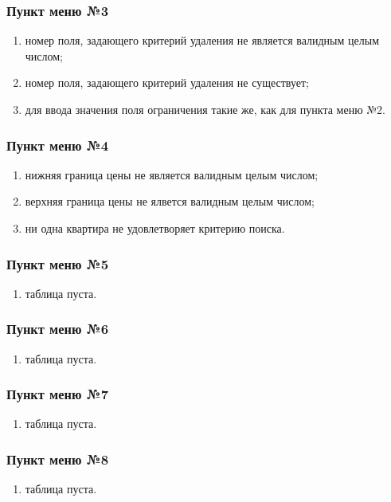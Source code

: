 \documentclass[a4paper,12pt]{extarticle}
\begin{document}
\subsubsection{Пункт меню №3}
\begin{enumerate}
    \item номер поля, задающего критерий удаления не является валидным целым числом;
    \item номер поля, задающего критерий удаления не существует;
    \item для ввода значения поля ограничения такие же, как для пункта меню №2.
\end{enumerate}

\subsubsection{Пункт меню №4}
\begin{enumerate}
    \item нижняя граница цены не является валидным целым числом;
    \item верхняя граница цены не ялвется валидным целым числом;
    \item ни одна квартира не удовлетворяет критерию поиска.
\end{enumerate}

\subsubsection{Пункт меню №5}
\begin{enumerate}
    \item таблица пуста.
\end{enumerate}

\subsubsection{Пункт меню №6}
\begin{enumerate}
    \item таблица пуста.
\end{enumerate}

\subsubsection{Пункт меню №7}
\begin{enumerate}
    \item таблица пуста.
\end{enumerate}

\subsubsection{Пункт меню №8}
\begin{enumerate}
    \item таблица пуста.
\end{enumerate}
\end{document}
